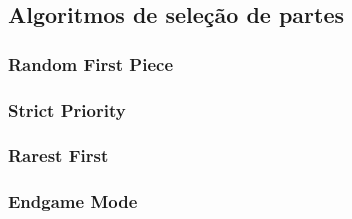 
\newpage
\subsection*{Algoritmos de seleção de partes}

\subsubsection*{Random First Piece}

\subsubsection*{Strict Priority}

\subsubsection*{Rarest First}

\subsubsection*{Endgame Mode}
